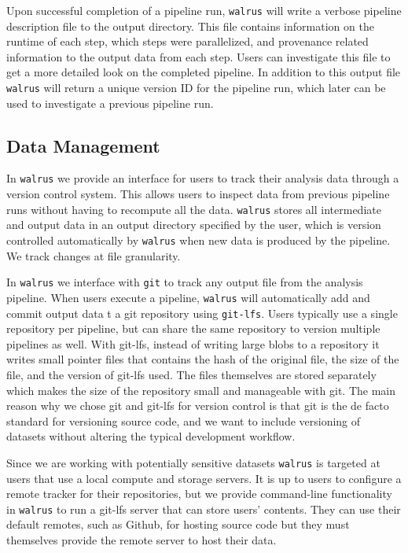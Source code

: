 Upon successful completion of a pipeline run, \texttt{walrus} will write a
verbose pipeline description file to the output directory. This file contains
information on the runtime of each step, which steps were parallelized, and
provenance related information to the output data from each step. Users can
investigate this file to get a more detailed look on the completed pipeline. In
addition to this output file \texttt{walrus} will return a unique version ID for
the pipeline run, which later can be used to investigate a previous pipeline
run.


\subsection{Data Management}
In \texttt{walrus} we provide an interface for users to track their analysis
data through a version control system. 
This allows users to inspect data from previous pipeline runs without having to
recompute all the data. \texttt{walrus} stores all intermediate and output data
in an output directory specified by the user, which is version controlled
automatically by \texttt{walrus} when new data is produced by the pipeline. We
track changes at file granularity. 

In \texttt{walrus} we interface with \texttt{git} to track any output file from
the analysis pipeline. When users execute a pipeline, \texttt{walrus} will 
automatically add and commit output data t a git repository using
\texttt{git-lfs}. 
Users typically use a single repository per pipeline, but can share the same 
repository to version multiple pipelines as well. With git-lfs, instead of
writing large blobs to a repository it writes small pointer files that contains
the hash of the original file, the size of the file, and the version of git-lfs
used. The files themselves are stored separately which makes the size of the
repository small and manageable with git. The main reason why we chose git and
git-lfs for version control is that git is the de facto standard for versioning
source code, and we want to include versioning of datasets without altering the
typical development workflow. 

Since we are working with potentially sensitive datasets \texttt{walrus} is
targeted at users that use a local compute and storage servers. It is up to
users to configure a remote tracker for their repositories, but we provide
command-line functionality in \texttt{walrus} to run a git-lfs server that can
store users' contents.  They can use their default remotes, such as Github, for
hosting source code but they must themselves provide the remote server to host
their data.

